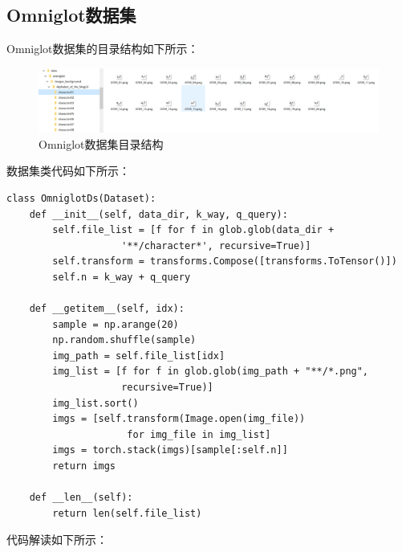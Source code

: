 \subsection{Omniglot数据集}
Omniglot数据集的目录结构如下所示：
\begin{figure}[H]
	\caption{Omniglot数据集目录结构}
	\label{f000116}
	\centering
	\includegraphics[width=15cm]{images/f000116}
\end{figure}
数据集类代码如下所示：
\begin{lstlisting}
class OmniglotDs(Dataset):
    def __init__(self, data_dir, k_way, q_query):
        self.file_list = [f for f in glob.glob(data_dir + 
                    '**/character*', recursive=True)]
        self.transform = transforms.Compose([transforms.ToTensor()])
        self.n = k_way + q_query

    def __getitem__(self, idx):
        sample = np.arange(20)
        np.random.shuffle(sample)
        img_path = self.file_list[idx]
        img_list = [f for f in glob.glob(img_path + "**/*.png", 
                    recursive=True)]
        img_list.sort()
        imgs = [self.transform(Image.open(img_file))
                     for img_file in img_list]
        imgs = torch.stack(imgs)[sample[:self.n]]
        return imgs

    def __len__(self):
        return len(self.file_list)   
\end{lstlisting}
代码解读如下所示：
